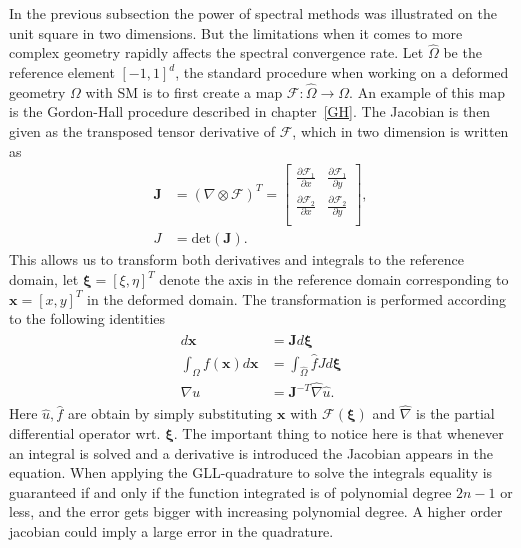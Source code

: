 In the previous subsection the power of spectral methods was illustrated on the unit square in two dimensions.
But the limitations when it comes to more complex geometry rapidly affects the spectral convergence rate. 
Let $\hat{\Omega}$ be the reference element $[-1,1]^d$,
the standard procedure when working on a deformed geometry $\Omega$ with SM is to first create a map 
$\mathcal{F}:\hat{\Omega}\rightarrow\Omega$. An example of this map is the Gordon-Hall procedure 
described in chapter~\ref{GH}.
The Jacobian is then given as the transposed tensor derivative of $\mathcal{F}$, which in two dimension is 
written as 
\begin{align}
    \mathbf{J} &= (\nabla \otimes \mathcal{F})^T =
\begin{bmatrix}
    \frac{\partial \mathcal{F}_1}{\partial x} &  \frac{\partial \mathcal{F}_1}{\partial y}  \\ 	
	\frac{\partial \mathcal{F}_2}{\partial x} &  \frac{\partial \mathcal{F}_2}{\partial y} \\ 	
\end{bmatrix},\\
J &= \text{det}(\mathbf{J}).
    \label{eq:jaobian}
\end{align}
This allows us to transform both derivatives and integrals to the reference domain, let $\boldsymbol\xi = [\xi,\eta]^T$ denote the axis in the reference 
domain corresponding to $\mathbf{x} = [x,y]^T$ in the deformed domain. The transformation is performed according to the following identities
\begin{align}
    \begin{split}
        d\mathbf{x} &= \mathbf{J}d\boldsymbol\xi \\
        \int_{\Omega}f(\mathbf{x})d\mathbf{x} &= \int_{\hat\Omega}\hat f J d\boldsymbol\xi \\
        \nabla u &= \mathbf{J}^{-T}\hat\nabla \hat u.
    \end{split}
    \label{eq:transforms}
\end{align}
Here $\hat u,\hat f$ are obtain by simply substituting $\mathbf{x}$ with $\mathcal{F}(\boldsymbol{\xi})$ and $\hat \nabla $ is the partial 
differential operator wrt. $\boldsymbol\xi$. The important thing to notice here is that whenever an integral is solved and a derivative is 
introduced the Jacobian appears in the equation. When applying the GLL-quadrature to solve the integrals equality is guaranteed if and 
only if the function integrated is of polynomial degree $2n-1$ or less, 
and the error gets bigger with increasing polynomial degree. A higher order jacobian could imply a large error in the quadrature.

